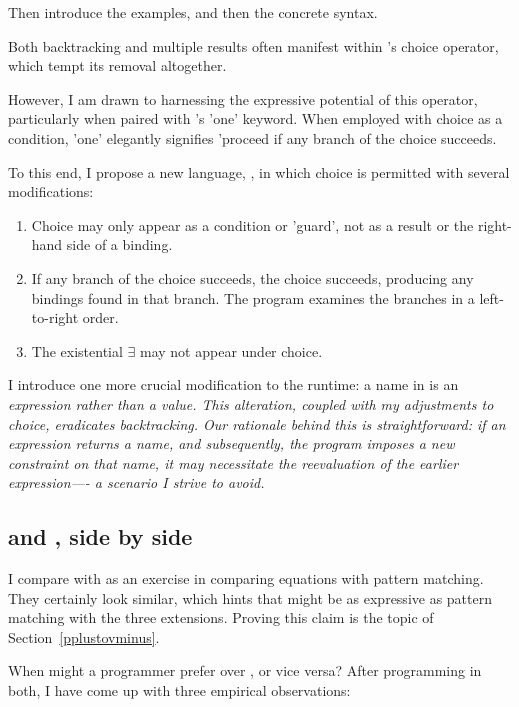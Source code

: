 \documentclass[manuscript,screen,review, 12pt, nonacm]{acmart}
\begin{document}
Then introduce the examples, and then the concrete syntax. 

Both backtracking and multiple results often manifest within \VC's
choice operator, which tempt its removal altogether. 

However, I am drawn
to harnessing the expressive potential of this operator, particularly
when paired with \VC's 'one' keyword. When employed with choice as a
condition, 'one' elegantly signifies 'proceed if any branch of the
choice succeeds. 

To this end, I propose a new language, \VMinus, in which choice is
permitted with several modifications:

\begin{enumerate}
\item Choice may only appear as a condition or 'guard', not as a result
or the right-hand side of a binding.
\item If any branch of the choice succeeds, the choice succeeds,
producing any bindings found in that branch. The program examines the
branches in a left-to-right order.
\item The existential $\exists$ may not appear under choice.
\end{enumerate}

I introduce one more crucial modification to the \VC runtime: a name in
\VMinus is an \it{expression} rather than a \it{value}. This alteration,
coupled with my adjustments to choice, eradicates backtracking. Our
rationale behind this is straightforward: if an expression returns a
name, and subsequently, the program imposes a new constraint on that
name, it may necessitate the reevaluation of the earlier expression—- a
scenario I strive to avoid. 

\subsection{\VMinus and \PPlus, side by side}
I compare \VMinus with \PPlus as an exercise in comparing equations with
pattern matching. They certainly look similar, which hints that \VMinus
might be as expressive as pattern matching with the three extensions. 
Proving this claim is the topic of Section~\ref{pplustovminus}. 

When might a programmer prefer \VMinus over \PPlus, or vice versa? After
programming in both, I have come up with three empirical observations: 
\end{document}
